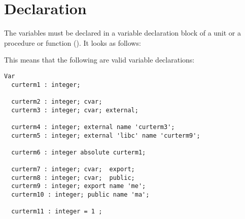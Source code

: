 \section{Declaration}
The variables must be declared in a variable declaration block of a unit
or a procedure or function (). It looks as follows:


 
This means that the following are valid variable declarations:
 
\begin{verbatim}
Var
  curterm1 : integer;

  curterm2 : integer; cvar;
  curterm3 : integer; cvar; external;

  curterm4 : integer; external name 'curterm3';
  curterm5 : integer; external 'libc' name 'curterm9';

  curterm6 : integer absolute curterm1;

  curterm7 : integer; cvar;  export;
  curterm8 : integer; cvar;  public;
  curterm9 : integer; export name 'me';
  curterm10 : integer; public name 'ma';

  curterm11 : integer = 1 ;
\end{verbatim}

